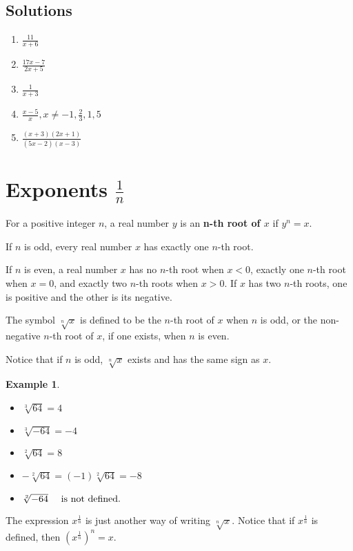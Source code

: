 \documentclass[11pt]{book}               %
\newtheorem{example}{Example}
\begin{document}
\subsection{Solutions} 
\begin{enumerate}
\item  $ \frac{11}{x+6} $  \  \quad
\item  $ \frac{17x-7}{2x+5} $ \ \quad
\item  $  \frac{1}{x+3} $ \  \quad
\item  $\frac{x-5}{x}, x \neq -1, \frac{2}{3}, 1, 5$ \ \quad 
\item $ \frac{(x+3)  (2x+1)}{ (5x-2) (x-3)}$ \ \quad
\end{enumerate}

\newpage
\section{Exponents $\frac{1}{n}$}

For a positive integer $n$, a real number $y$ is an {\bf n-th root of $x$} if $y^n=x$. 

If $n$ is odd, every real number $x$ has exactly one $n$-th root. 

If $n$ is even, a real number $x$ has no $n$-th root when $x<0$, exactly one $n$-th root when $x=0$, and exactly two $n$-th roots when $x>0$. If $x$ has two $n$-th roots, one is positive and the other is its negative. 

The symbol $\sqrt[n]{x}$ is defined to be the $n$-th root of $x$ when $n$ is odd, or the non-negative $n$-th root of $x$, if one exists, when $n$ is even. 

Notice that if $n$ is odd, $\sqrt[n]{x}$ exists and has the same sign as $x$.

\begin{example}
$ $
\begin{itemize}
\item $ \sqrt[3]{64} = 4$
\item $\sqrt[3]{-64} = -4$
\item $\sqrt[2]{64} = 8$
\item $-\sqrt[2]{64}  = (-1) \sqrt[2]{64} =-8 $ 
\item $\sqrt[2]{-64} \quad\textnormal{ is not defined.}$

\end{itemize}
\end{example}
The expression $x^\frac{1}{n}$ is just another way of writing $\sqrt[n]{x}$. 
Notice that if $x^\frac{1}{n}$ is defined, then  $\left(x^\frac{1}{n}\right)^n=x$. 
\end{document}
